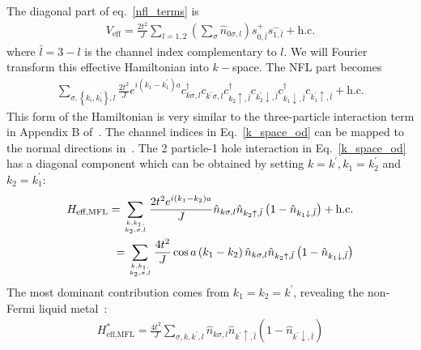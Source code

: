 \documentclass[reprint,prb,superscriptaddress]{revtex4-1}
\begin{document}
The diagonal part of eq.~\ref{nfl_terms} is
\begin{equation}\begin{aligned}
	V_\text{eff} = \frac{2t^2}{J}\sum_{l=1,2}\left(\sum_\sigma \hat n_{0\sigma,l}\right) s^+_{0,\bar l}s^-_{1,\bar l} + \text{h.c.}
\end{aligned}\end{equation}
where \(\bar l = 3 - l\) is the channel index complementary to \(l\). We will Fourier transform this effective Hamiltonian into \(k-\)space. The NFL part becomes
\begin{equation}\begin{aligned}
	\label{k_space_od}
	\sum_{\sigma, \left\{k_i,k_i^\prime\right\},l} \frac{2t^2}{J}e^{i\left(k_1 - k_1^\prime\right)a}c^\dagger_{k\sigma,l}c_{k^\prime\sigma,l}c^\dagger_{k_2 \uparrow, \bar l}c_{k_2^\prime \downarrow,\bar l}c^\dagger_{k_1 \downarrow,\bar l}c_{k_1^\prime \uparrow, \bar l} + \text{h.c.} 
\end{aligned}\end{equation}
This form of the Hamiltonian is very similar to the three-particle interaction term in Appendix B of~\cite{anirbanmott1}. The channel indices in Eq.~\ref{k_space_od} can be mapped to the normal directions in~\cite{anirbanmott1}. The 2 particle-1 hole interaction in Eq.~\ref{k_space_od} has a diagonal component which can be obtained by setting \(k=k^\prime, k_1 = k_2^\prime\) and \(k_2 = k_1^\prime\):
\begin{equation}\begin{aligned}
	H_\text{eff,MFL} = \sum_{k, k_1, \atop{k_2,\sigma,  l}} \frac{2t^2e^{i\left(k_1 - k_2\right)a}}{J} \hat n_{k\sigma,l} \hat n_{k_2 \uparrow, \bar l}\left(1 - \hat n_{k_1 \downarrow,\bar l}\right) + \text{h.c.}\\
	= \sum_{k, k_1, \atop{k_2,\sigma,  l}} \frac{4t^2}{J} \cos a\left(k_1 - k_2\right)  \hat n_{k\sigma,l} \hat n_{k_2 \uparrow, \bar l}\left(1 - \hat n_{k_1 \downarrow,\bar l}\right)
\end{aligned}\end{equation}
The most dominant contribution comes from \(k_1 = k_2 = k^\prime\), revealing the non-Fermi liquid metal~\cite{cox_jarrell_two_channel_rev,andrei_jerez_1995}:
\begin{equation}\begin{aligned}
	\label{mfl_large}
	H^*_\text{eff,MFL} = \frac{4t^2}{J} \sum_{\sigma, k, k^\prime, l} \hat n_{k\sigma,l} \hat n_{k^\prime \uparrow, \bar l}\left(1 - \hat n_{k^\prime \downarrow,\bar l}\right)
\end{aligned}\end{equation}
\end{document}
